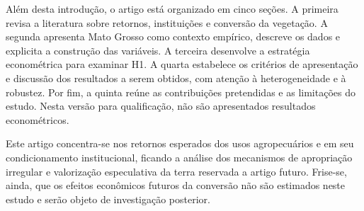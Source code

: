 Além desta introdução, o artigo está organizado em cinco seções. A primeira revisa a literatura sobre retornos, instituições e conversão da vegetação. A segunda apresenta Mato Grosso como contexto empírico, descreve os dados e explicita a construção das variáveis. A terceira desenvolve a estratégia econométrica para examinar H1. A quarta estabelece os critérios de apresentação e discussão dos resultados a serem obtidos, com atenção à heterogeneidade e à robustez. Por fim, a quinta reúne as contribuições pretendidas e as limitações do estudo. Nesta versão para qualificação, não são apresentados resultados econométricos.

Este artigo concentra-se nos retornos esperados dos usos agropecuários e em seu condicionamento institucional, ficando a análise dos mecanismos de apropriação irregular e valorização especulativa da terra reservada a artigo futuro. Frise-se, ainda, que os efeitos econômicos futuros da conversão não são estimados neste estudo e serão objeto de investigação posterior.
